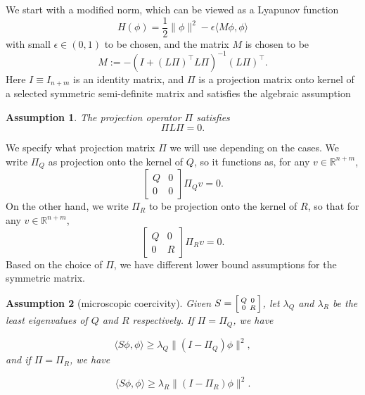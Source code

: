 \documentclass[11pt]{article}
\newtheorem{assumption}{Assumption}
\newcommand{\Rm}{{\mathbb R}}
\newcommand{\1}{\mathds{1}}
\begin{document}
        
We start with a modified norm, which can be viewed as a Lyapunov function 
\begin{equation}
    H(\phi) = \frac{1}{2}\|\phi\|^2-\epsilon\langle M\phi, \phi\rangle
\end{equation}
with small $\epsilon\in (0,1)$ to be chosen, and the matrix $M$ is chosen to be
\begin{equation}\label{operator:M}
    M :=- ( I+(L\Pi)^{\top} L\Pi)^{-1}(L\Pi)^{\top}.
\end{equation}
Here $I \equiv I_{n+m}$ is an identity matrix, and $\Pi$ is a projection matrix onto kernel of a selected symmetric semi-definite matrix and satisfies the  algebraic assumption 
\begin{assumption}\label{assump:ag} The projection operator $\Pi$ satisfies
   \begin{equation}
    \Pi L \Pi = 0.
\end{equation} 
\end{assumption}
We specify what projection matrix $\Pi$ we will use depending on the cases. We write $\Pi_Q$ as projection onto the kernel of $Q$, so it functions as, for any $v\in \Rm^{n+m}$,
\begin{equation}
    \begin{bmatrix}
            Q & 0\\
            0 &  0
        \end{bmatrix}\Pi_Q v = 0.
\end{equation}
On the other hand, we write $\Pi_R$ to be projection onto the kernel of $R$, so that for any $v\in \Rm^{n+m}$,
\begin{equation}
    \begin{bmatrix}
            Q & 0\\
            0 &  R
        \end{bmatrix}\Pi_R v = 0.
\end{equation}
Based on the choice of $\Pi$, we have different lower bound assumptions for the symmetric matrix.
\begin{assumption}[microscopic coercivity]\label{assump:D}
 Given $S = \Bigl[\begin{smallmatrix}
            Q & 0\\
            0 &  R
        \end{smallmatrix}\Bigr]$, let $\lambda_Q$ and $\lambda_R$ be the least eigenvalues of $Q$ and $R$ respectively.  If $\Pi=\Pi_Q$, we have
        
        \begin{equation}
            \langle S\phi, \phi\rangle\geq \lambda_Q \|(I-\Pi_Q)\phi\|^2,
        \end{equation}
 and if $\Pi=\Pi_R$, we have
        
        \begin{equation}
           \langle S\phi, \phi\rangle\geq \lambda_R \|(I-\Pi_R)\phi\|^2.
        \end{equation}
\end{assumption}
\end{document}
